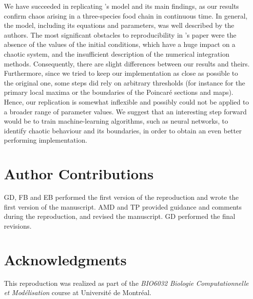 We have succeeded in replicating \citeauthor{hastings1991}'s model and its main findings, as our
results confirm chaos arising in a three-species food chain in continuous time.
In general, the model, including its equations and parameters, was well described by the
authors. The most significant obstacles to reproducibility in \citeauthor{hastings1991}'s paper
were the absence of the values of the initial conditions, which have a huge impact on a
chaotic system, and the insufficient description of the numerical integration methods.
Consequently, there are slight differences between our results and theirs.
Furthermore, since we tried to keep our implementation as close as possible to the
original one, some steps did rely on arbitrary thresholds (for instance for the primary
local maxima or the boundaries of the Poincaré sections and maps).
Hence, our replication is somewhat inflexible and possibly could not be applied to
a broader range of parameter values.
We suggest that an interesting step forward would be to train machine-learning algorithms,
such as neural networks, to identify chaotic behaviour and its boundaries, in order to
obtain an even better performing implementation.

\section{Author Contributions}
GD, FB and EB performed the first version of the reproduction and wrote the first version of the manuscript. AMD and TP provided guidance and comments during the reproduction, and revised the manuscript. GD performed the final revisions.

\section{Acknowledgments}
This reproduction was realized as part of the \textit{BIO6032 Biologie Computationnelle et Modélisation} course at Université de Montréal.

\newpage

